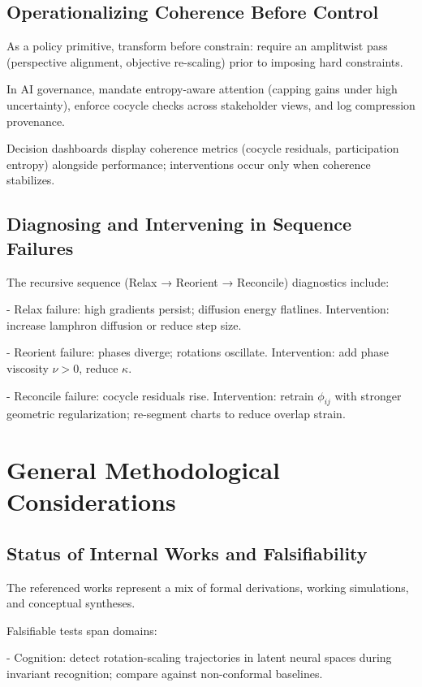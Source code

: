 \documentclass[12pt]{article}
\begin{document}
\subsection{Operationalizing Coherence Before Control}

As a policy primitive, transform before constrain: require an amplitwist pass (perspective alignment, objective re-scaling) prior to imposing hard constraints.

In AI governance, mandate entropy-aware attention (capping gains under high uncertainty), enforce cocycle checks across stakeholder views, and log compression provenance.

Decision dashboards display coherence metrics (cocycle residuals, participation entropy) alongside performance; interventions occur only when coherence stabilizes.

\subsection{Diagnosing and Intervening in Sequence Failures}

The recursive sequence (Relax → Reorient → Reconcile) diagnostics include:

- Relax failure: high gradients persist; diffusion energy flatlines. Intervention: increase lamphron diffusion or reduce step size.

- Reorient failure: phases diverge; rotations oscillate. Intervention: add phase viscosity $\nu > 0$, reduce $\kappa$.

- Reconcile failure: cocycle residuals rise. Intervention: retrain $\phi_{ij}$ with stronger geometric regularization; re-segment charts to reduce overlap strain.

\section{General Methodological Considerations}

\subsection{Status of Internal Works and Falsifiability}

The referenced works represent a mix of formal derivations, working simulations, and conceptual syntheses.

Falsifiable tests span domains:

- Cognition: detect rotation-scaling trajectories in latent neural spaces during invariant recognition; compare against non-conformal baselines.
\end{document}
